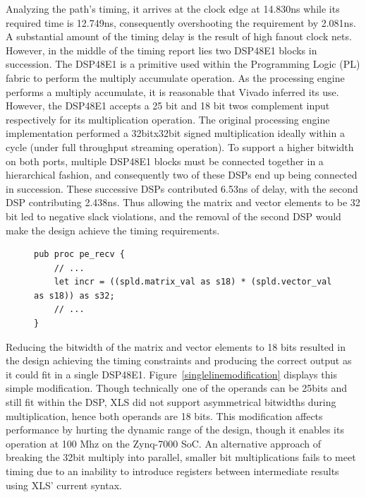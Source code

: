 Analyzing the path's timing, it arrives at the clock edge at 14.830ns while its required time is 12.749ns, consequently overshooting the requirement by 2.081ns. A substantial amount of the timing delay is the result of high fanout clock nets. However, in the middle of the timing report lies two DSP48E1 blocks \cite{dsp48} in succession. The DSP48E1 is a primitive used within the Programming Logic (PL) fabric to perform the multiply accumulate operation. As the processing engine performs a multiply accumulate, it is reasonable that Vivado inferred its use. However, the DSP48E1 accepts a 25 bit and 18 bit twos complement input respectively for its multiplication operation. The original processing engine implementation performed a 32bitx32bit signed multiplication ideally within a cycle (under full throughput streaming operation). To support a higher bitwidth on both ports, multiple DSP48E1 blocks must be connected together in a hierarchical fashion, and consequently two of these DSPs end up being connected in succession. These successive DSPs contributed 6.53ns of delay, with the second DSP contributing 2.438ns. Thus allowing the matrix and vector elements to be 32 bit led to negative slack violations, and the removal of the second DSP would make the design achieve the timing requirements.

\begin{figure}[H]
\begin{lstlisting}[label={singlelinemodification},caption={Single line modification necessary to acheive 100Mhz. Multiply inputs wrapped with s18 casts. Accumulation with the 32bit increment is still supported as the DSP48E1 supports up to 48 bit accumulation}, captionpos=b,style=mystyle]
pub proc pe_recv {
    // ...
    let incr = ((spld.matrix_val as s18) * (spld.vector_val as s18)) as s32;
    // ...
}
\end{lstlisting}
\end{figure}

Reducing the bitwidth of the matrix and vector elements to 18 bits resulted in the design achieving the timing constraints and producing the correct output as it could fit in a single DSP48E1. Figure~\ref{singlelinemodification} displays this simple modification. Though technically one of the operands can be 25bits and still fit within the DSP, XLS did not support asymmetrical bitwidths during multiplication, hence both operands are 18 bits. This modification affects performance by hurting the dynamic range of the design, though it enables its operation at 100 Mhz on the Zynq-7000 SoC. An alternative approach of breaking the 32bit multiply into parallel, smaller bit multiplications fails to meet timing due to an inability to introduce registers between intermediate results using XLS' current syntax.

